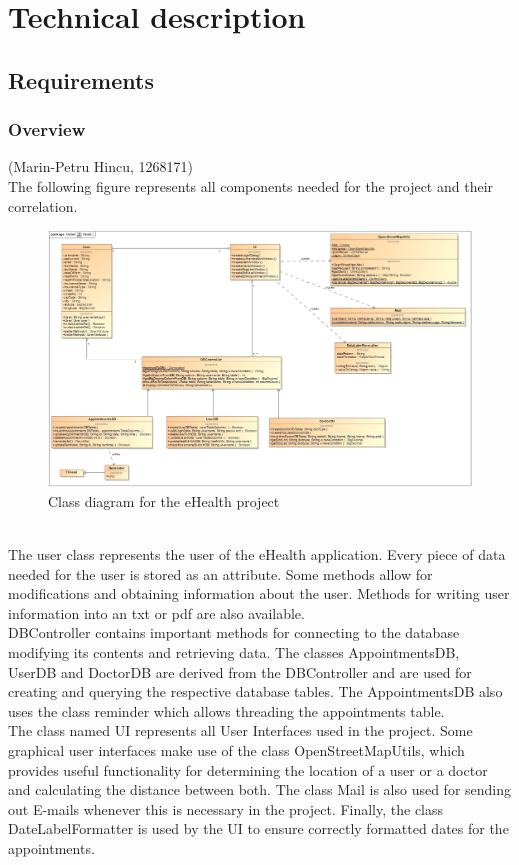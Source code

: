\documentclass[a4paper, 12pt]{report}
\begin{document}


\chapter{Technical description}
\section{Requirements}
\subsection{Overview}
{\tiny (Marin-Petru Hincu, 1268171)\\}
The following figure represents all components needed for the project and their correlation.
\begin{figure}[!h]
\includegraphics[width=\linewidth]{clImg.png} 
\caption{Class diagram for the eHealth project}
\end{figure}
\\The user class represents the user of the eHealth application. Every piece of data needed for the user is stored as an attribute. Some methods allow for modifications and obtaining information about the user. Methods for writing user information into an txt or pdf are also available. \\
DBController contains important methods for connecting to the database modifying its contents and retrieving data. The classes AppointmentsDB, UserDB and DoctorDB are derived from the DBController and are used for creating and querying the respective database tables. The AppointmentsDB also uses the class reminder which allows threading the appointments table.\\The class named UI represents all User Interfaces used in the project. Some graphical user interfaces make use of the class OpenStreetMapUtils, which provides useful functionality for determining the location of a user or a doctor and calculating the distance between both. The class Mail is also used for sending out E-mails whenever this is necessary in the project. Finally, the class DateLabelFormatter is used by the UI to ensure correctly formatted dates for the appointments. \\
\end{document}

